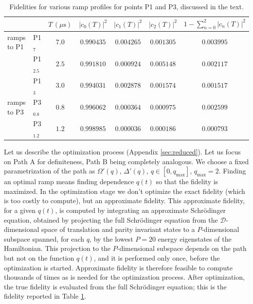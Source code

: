 \documentclass[a4paper,11pt]{article}
\theoremstyle{remark}
\theoremstyle{theorem}
\begin{document}
\begin{table}[h]\centering
\begin{tabular}{llccccc}
	\toprule
	& 
	& $T\,(\mu\mathrm{s})$
	& $|c_0(T)|^2$
	& $|c_1(T)|^2$
	& $|c_2(T)|^2$
	& $1-\displaystyle\sum_{n=0}^{2}|c_n(T)|^2$ \\
	\midrule
	ramps to P1 & P1$_7$ \cite{Fang:2024uyf} & $7.0$ & $0.990435$ & $0.004265$ & $0.001305$ & $0.003995$ \\
	& P1$_{2.5}$ & $2.5$ & $0.991810$ & $0.000924$ & $0.005148$ & $0.002117$ \\
	& P1$_3$ & $3.0$ & $0.994031$ & $0.002878$ & $0.001574$ & $0.001517$ \\
	\midrule
	ramps to P3 & P3$_{0.8}$ & $0.8$ & $0.996062$ & $0.000364$ & $0.000975$ & $0.002599$ \\
	& P3$_{1.2}$ & $1.2$ & $0.998985$ & $0.000036$ & $0.000186$ & $0.000793$ \\
	\bottomrule
	\end{tabular}
\caption{\label{tab:fidel}Fidelities for various ramp profiles for points P1 and P3, discussed in the text.}
\end{table}
Let us describe the optimization process (Appendix \ref{sec:reduced}). Let us focus on Path A for definiteness, Path B being completely analogous. We choose a fixed parametrization of the path as $\Omega'(q)$, $\Delta'(q)$, $q\in [0,q_{\max}]$, $q_{\max}=2$. Finding an optimal ramp means finding dependence $q(t)$ so that the fidelity is maximized. In the optimization stage we don't optimize the exact fidelity (which is too costly to compute), but an approximate fidelity. This approximate fidelity, for a given $q(t)$, is computed by integrating an approximate Schr\"odinger equation, obtained by projecting the full Schr\"odinger equation from the $\mathcal{D}$-dimensional space of translation and parity invariant states to a $P$-dimensional subspace spanned, for each $q$, by the lowest $P=20$ energy eigenstates of the Hamiltonian. This projection to the $P$-dimensional subspace depends on the path but not on the function $q(t)$, and it is performed only once, before the optimization is started. Approximate fidelity is therefore feasible to compute thousands of times as is needed for the optimization process. After optimization, the true fidelity is evaluated from the full Schr\"odinger equation; this is the fidelity reported in Table \ref{tab:fidel}.
\end{document}
